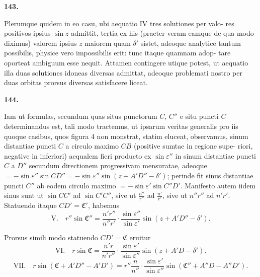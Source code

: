 \documentclass[12pt,a4paper]{article}
\begin{document}
\bigskip
\noindent\textbf{143.}

Plerumque quidem in eo casu, ubi aequatio IV tres solutiones per valo-
res positivos ipsius $\sin z$ admittit, tertia ex his (praeter veram eamque de qua
modo diximus) valorem ipsius $z$ maiorem quam $\delta'$ sistet, adeoque analytice
tantum possibilis, physice vero impossibilis erit: tunc itaque quamnam adop-
tare oporteat ambiguum esse nequit. Attamen contingere utique potest, ut
aequatio illa duas solutiones idoneas diversas admittat, adeoque problemati
nostro per duas orbitas prorsus diversas satisfacere liceat.

\bigskip
\noindent\textbf{144.}

Iam ut formulas, secundum quas situs punctorum $C$, $C''$ e situ puncti $C$
determinandus est, tali modo tractemus, ut ipsarum veritas generalis pro iis
quoque casibus, quos figura 4 non monstrat, statim eluceat, observamus, sinum
distantiae puncti $C$ a circulo maximo $CB$ (positive sumtae in regione supe-
riori, negative in inferiori) aequalem fieri producto ex $\sin\varepsilon''$ in sinum distantiae
puncti $C$ a $D''$ secundum directionem progressivam mensuratae, adeoque
$= -\sin\varepsilon'' \sin CD'' = -\sin\varepsilon'' \sin(z + A'D'' - \delta')$; perinde fit sinus distantiae
puncti $C''$ ab eodem circulo maximo $= -\sin\varepsilon'\sin C''D'$. Manifesto autem
iidem sinus sunt ut $\sin CC'$ ad $\sin C'C''$, sive ut $\frac{n''}{r''}$ ad $\frac{n'}{r'}$, sive ut $n''r''$ ad
$n'r'$. Statuendo itaque $CD' = \mathfrak{C}'$, habemus
\begin{equation}
\text{V.} \quad r''\sin\mathfrak{C}'' = \frac{n'r''}{n''r'} \cdot \frac{\sin\varepsilon''}{\sin\varepsilon'} \sin(z + A'D'' - \delta'). \tag{V}
\end{equation}

Prorsus simili modo statuendo $CD' = \mathfrak{C}$ eruitur
\begin{equation}
\text{VI.} \quad r\sin\mathfrak{C} = \frac{n'r}{n'r''} \cdot \frac{\sin\varepsilon'}{\sin\varepsilon''} \sin(z + A'D - \delta'). \tag{VI}
\end{equation}
\begin{equation}
\text{VII.} \quad r\sin(\mathfrak{C} + A'D'' - A'D') = r''\frac{n}{n''} \cdot \frac{\sin\varepsilon'}{\sin\varepsilon''} \sin(\mathfrak{C}'' + A''D - A''D'). \tag{VII}
\end{equation}
\end{document}
